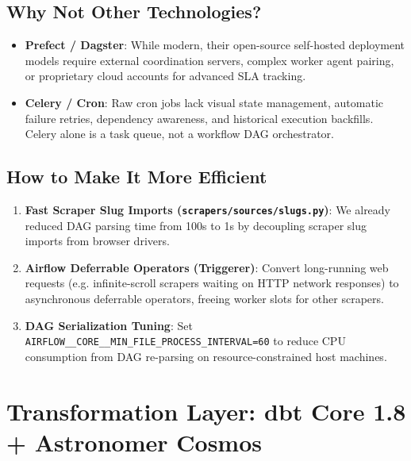 \documentclass[a4paper, 11pt]{article}
\begin{document}
\subsection{Why Not Other Technologies?}
\begin{itemize}[leftmargin=*]
    \item \textbf{Prefect / Dagster}: While modern, their open-source self-hosted deployment models require external coordination servers, complex worker agent pairing, or proprietary cloud accounts for advanced SLA tracking.
    \item \textbf{Celery / Cron}: Raw cron jobs lack visual state management, automatic failure retries, dependency awareness, and historical execution backfills. Celery alone is a task queue, not a workflow DAG orchestrator.
\end{itemize}

\subsection{How to Make It More Efficient}
\begin{tcolorbox}[colback=accentgreen!10, colframe=accentgreen, title=Optimization Recommendations for Airflow]
\begin{enumerate}[leftmargin=*]
    \item \textbf{Fast Scraper Slug Imports (\texttt{scrapers/sources/slugs.py})}: We already reduced DAG parsing time from 100s to 1s by decoupling scraper slug imports from browser drivers.
    \item \textbf{Airflow Deferrable Operators (Triggerer)}: Convert long-running web requests (e.g. infinite-scroll scrapers waiting on HTTP network responses) to asynchronous deferrable operators, freeing worker slots for other scrapers.
    \item \textbf{DAG Serialization Tuning}: Set \texttt{AIRFLOW\_\_CORE\_\_MIN\_FILE\_PROCESS\_INTERVAL=60} to reduce CPU consumption from DAG re-parsing on resource-constrained host machines.
\end{enumerate}
\end{tcolorbox}

\section{Transformation Layer: dbt Core 1.8 + Astronomer Cosmos}
\end{document}
